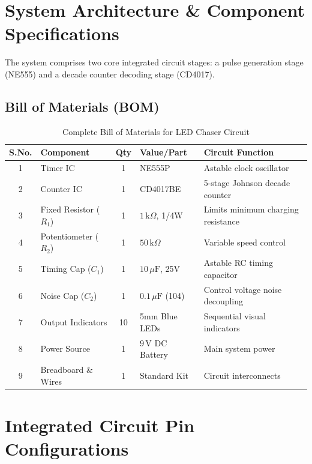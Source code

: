 \documentclass[11pt,a4paper]{article}
\begin{document}
\section{System Architecture \& Component Specifications}
The system comprises two core integrated circuit stages: a pulse generation stage (NE555) and a decade counter decoding stage (CD4017).

\subsection{Bill of Materials (BOM)}
\begin{table}[h!]
\centering
\caption{Complete Bill of Materials for LED Chaser Circuit}
\vspace{0.5em}
\begin{tabular}{@{}c l c l p{6cm}@{}}
\toprule
\textbf{S.No.} & \textbf{Component} & \textbf{Qty} & \textbf{Value/Part} & \textbf{Circuit Function} \\
\midrule
1 & Timer IC & 1 & NE555P & Astable clock oscillator \\
2 & Counter IC & 1 & CD4017BE & 5-stage Johnson decade counter \\
3 & Fixed Resistor ($R_1$) & 1 & $1\,\text{k}\Omega$, 1/4W & Limits minimum charging resistance \\
4 & Potentiometer ($R_2$) & 1 & $50\,\text{k}\Omega$ & Variable speed control \\
5 & Timing Cap ($C_1$) & 1 & $10\,\mu\text{F}$, 25V & Astable RC timing capacitor \\
6 & Noise Cap ($C_2$) & 1 & $0.1\,\mu\text{F}$ (104) & Control voltage noise decoupling \\
7 & Output Indicators & 10 & 5mm Blue LEDs & Sequential visual indicators \\
8 & Power Source & 1 & $9\,\text{V}$ DC Battery & Main system power \\
9 & Breadboard \& Wires & 1 & Standard Kit & Circuit interconnects \\
\bottomrule
\end{tabular}
\end{table}

\section{Integrated Circuit Pin Configurations}
\end{document}
